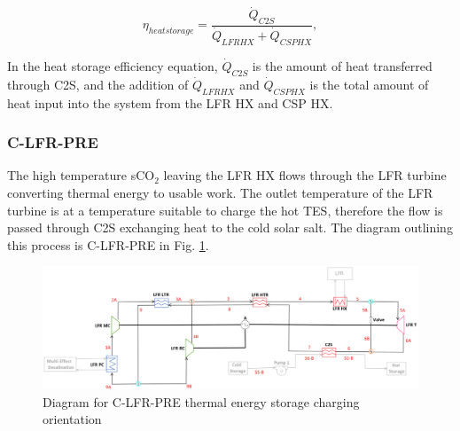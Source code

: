 \begin{paracol}{2}
\begin{equation}
    \label{eq-eta-heatstorage}
    \eta_{heatstorage} = \frac{\dot{Q}_{C2S}}{\dot{Q}_{LFRHX}+\dot{Q}_{CSPHX}},
\end{equation}

In the heat storage efficiency equation, $\dot{Q}_{C2S}$ is the amount of heat transferred through C2S, and the addition of $\dot{Q}_{LFRHX}$ and $\dot{Q}_{CSPHX}$ is the total amount of heat input into the system from the LFR HX and CSP HX. 

\subsubsection{C-LFR-PRE} 

The high temperature sCO$_2$ leaving the LFR HX flows through the LFR turbine converting thermal energy to usable work. The outlet temperature of the LFR turbine is at a temperature suitable to charge the hot TES, therefore the flow is passed through C2S exchanging heat to the cold solar salt. The diagram outlining this process is C-LFR-PRE in Fig. \ref{c-lfr-pre}. 

\end{paracol}
\begin{figure}[H]
    \widefigure
    \includegraphics[width=\linewidth]{Definitions/c-lfr-pre.pdf}
    \caption{Diagram for C-LFR-PRE thermal energy storage charging orientation\label{c-lfr-pre}}
\end{figure}
